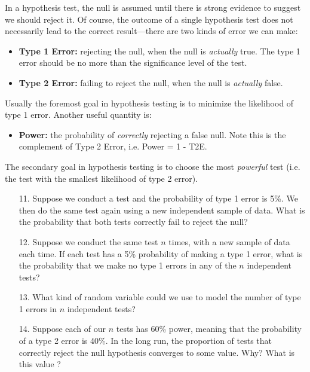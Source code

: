 \documentclass[10pt]{extarticle}
\begin{document}
\hfill 

In a hypothesis test, the null is assumed until there is strong evidence to suggest we should reject it. Of course, the outcome of a single hypothesis test does not necessarily lead to the correct result---there are two kinds of error we can make: 

\begin{itemize}	
	\item {\bf Type 1 Error:} rejecting the null, when the null is {\it actually} true. The type 1 error should be no more than the significance level of the test.  
	\item {\bf Type 2 Error:} failing to reject the null, when the null is {\it actually} false. 
\end{itemize} 

Usually the foremost goal in hypothesis testing is to minimize the likelihood of type 1 error. Another useful quantity is:

\begin{itemize}
	\item {\bf Power:} the probability of {\it correctly} rejecting a false null.  Note this is the complement of Type 2 Error, i.e. Power = 1 - T2E. 
\end{itemize} 

The secondary goal in hypothesis testing is to choose the most {\it powerful} test (i.e. the test with the smallest likelihood of type 2 error). 

\hfill 

\begin{itemize}

	\item[11.] Suppose we conduct a test and the probability of type 1 error  is 5\%. We then do the same test again using a new independent sample of data. What is the probability that both tests correctly fail to reject the null? \\ 

	\item[12.] Suppose we conduct the same test $n$ times, with a new sample of data each time. If each test has a 5\% probability of making a type 1 error, what is the probability that we make no type 1 errors in any of the $n$ independent tests? \\ 

	\item[13.] What kind of random variable could we use to model the number of type 1 errors in $n$ independent tests? \\ 

	\item[14.] Suppose each of our $n$ tests has 60\% power, meaning that the probability of a type 2 error is 40\%. In the long run, the proportion of tests that correctly reject the null hypothesis converges to some value. Why? What is this value ? \\

\end{itemize}
\end{document}
